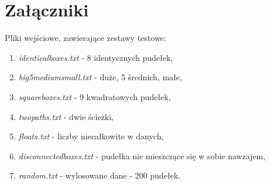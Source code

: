 \documentclass{article}
\begin{document}
\section{Załączniki}
Pliki wejściowe, zawierające zestawy testowe:
\begin{enumerate}
\item \textit{identical\textunderscore boxes.txt} - 8 identycznych pudełek,
\item \textit{big\textunderscore 5medium\textunderscore small.txt} - duże, 5 średnich, małe,
\item \textit{square\textunderscore boxes.txt} - 9 kwadratowych pudełek,
\item \textit{two\textunderscore paths.txt} - dwie ścieżki,
\item \textit{floats.txt} - liczby niecałkowite w danych,
\item \textit{disconnected\textunderscore boxes.txt} - pudełka nie mieszczące się w sobie nawzajem,
\item \textit{random.txt} - wylosowane dane - 200 pudełek.

\end{enumerate}
\end{document}
